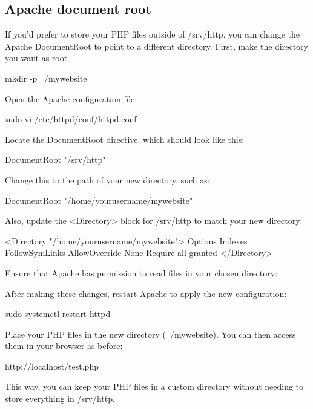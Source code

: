 \documentclass{report}
\begin{document}
    \bigbreak \noindent 
    \subsection{Apache document root}
    \bigbreak \noindent 
    If you’d prefer to store your PHP files outside of /srv/http, you can change the Apache DocumentRoot to point to a different directory.
    \bigbreak \noindent 
    First, make the directory you want as root
    \bigbreak \noindent 
    \begin{bashcode}
    mkdir -p ~/mywebsite
    \end{bashcode}
    \bigbreak \noindent 
    Open the Apache configuration file:
    \bigbreak \noindent 
    \begin{bashcode}
    sudo vi /etc/httpd/conf/httpd.conf
    \end{bashcode}
    \bigbreak \noindent 
    Locate the DocumentRoot directive, which should look like this:
    \bigbreak \noindent 
    \begin{bashcode}
    DocumentRoot "/srv/http"
    \end{bashcode}
    \bigbreak \noindent 
    Change this to the path of your new directory, such as:
    \bigbreak \noindent 
    \begin{bashcode}
    DocumentRoot "/home/yourusername/mywebsite"
    \end{bashcode}
    \bigbreak \noindent 
    Also, update the <Directory> block for /srv/http to match your new directory:
    \bigbreak \noindent 
    \begin{bashcode}
        <Directory "/home/yourusername/mywebsite">
            Options Indexes FollowSymLinks
            AllowOverride None
            Require all granted
        </Directory>
    \end{bashcode}
    \bigbreak \noindent 
    Ensure that Apache has permission to read files in your chosen directory:
    \bigbreak \noindent 
    \bigbreak \noindent 
    After making these changes, restart Apache to apply the new configuration:
    \bigbreak \noindent 
    \begin{bashcode}
    sudo systemctl restart httpd
    \end{bashcode}
    \bigbreak \noindent 
    Place your PHP files in the new directory (~/mywebsite). You can then access them in your browser as before:
    \bigbreak \noindent 
    \begin{bashcode}
    http://localhost/test.php
    \end{bashcode}
    \bigbreak \noindent 
    This way, you can keep your PHP files in a custom directory without needing to store everything in /srv/http.
\end{document}
